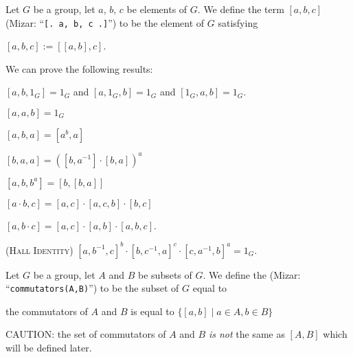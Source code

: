 \documentclass{article}
\begin{document}
\begin{definition}
Let $G$ be a group, let $a$, $b$, $c$ be elements of $G$.
We define the term $[a,b,c]$ (Mizar: ``\verb#[. a, b, c .]#'') to be the
element of $G$ satisfying
\begin{defn}
\item $[a,b,c]:=[[a,b],c]$.
\end{defn}
\end{definition}

We can prove the following results:
\begin{thm}
\item\label{group5:39} $[a,b,1_{G}]=1_{G}$ and $[a,1_{G},b]=1_{G}$
  and $[1_{G},a,b]=1_{G}$.
\item\label{group5:40} $[a,a,b]=1_{G}$
\item\label{group5:41} $[a,b,a]=[a^{b},a]$
\item\label{group5:42} $[b,a,a]=([b,a^{-1}]\cdot[b,a])^{a}$
\item\label{group5:43} $[a,b,b^{a}]=[b,[b,a]]$
\item\label{group5:44} $[a\cdot b,c]=[a,c]\cdot[a,c,b]\cdot[b,c]$
\item\label{group5:45} $[a,b\cdot c]=[a,c]\cdot[a,b]\cdot[a,b,c]$.
\item\label{group5:46} (\textsc{Hall Identity})
  $[a,b^{-1},c]^{b}\cdot[b,c^{-1},a]^{c}\cdot[c,a^{-1},b]^{a}=1_{G}$.
\end{thm}

\begin{definition}
Let $G$ be a group, let $A$ and $B$ be subsets of $G$.
We define the  (Mizar: ``\verb#commutators(A,B)#'')
to be the subset of $G$ equal to
\begin{defn}
\item the commutators of $A$ and $B$ is equal to $\{[a,b]\mid a\in A,b\in B\}$
\end{defn}
\end{definition}

\begin{remark}
CAUTION: the set of commutators of $A$ and $B$ \emph{is not} the same as
$[A,B]$ which will be defined later.
\end{remark}
\end{document}
